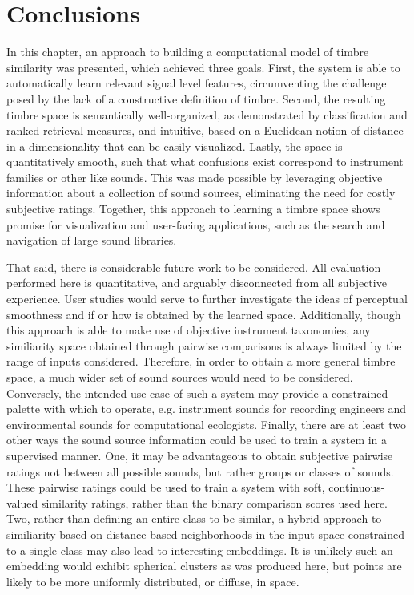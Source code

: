 \section{Conclusions}
\label{sec:conclusions}

In this chapter, an approach to building a computational model of timbre similarity was presented, which achieved three goals.
First, the system is able to automatically learn relevant signal level features, circumventing the challenge posed by the lack of a constructive definition of timbre.
Second, the resulting timbre space is semantically well-organized, as demonstrated by classification and ranked retrieval measures, and intuitive, based on a Euclidean notion of distance in a dimensionality that can be easily visualized.
Lastly, the space is quantitatively smooth, such that what confusions exist correspond to instrument families or other like sounds.
This was made possible by leveraging objective information about a collection of sound sources, eliminating the need for costly subjective ratings.
Together, this approach to learning a timbre space shows promise for visualization and user-facing applications, such as the search and navigation of large sound libraries.

That said, there is considerable future work to be considered.
All evaluation performed here is quantitative, and arguably disconnected from all subjective experience.
User studies would serve to further investigate the ideas of perceptual smoothness and if or how is obtained by the learned space.
Additionally, though this approach is able to make use of objective instrument taxonomies, any similiarity space obtained through pairwise comparisons is always limited by the range of inputs considered.
Therefore, in order to obtain a more general timbre space, a much wider set of sound sources would need to be considered.
Conversely, the intended use case of such a system may provide a constrained palette with which to operate, e.g. instrument sounds for recording engineers and environmental sounds for computational ecologists.
Finally, there are at least two other ways the sound source information could be used to train a system in a supervised manner.
One, it may be advantageous to obtain subjective pairwise ratings not between all possible sounds, but rather groups or classes of sounds.
These pairwise ratings could be used to train a system with soft, continuous-valued similarity ratings, rather than the binary comparison scores used here.
Two, rather than defining an entire class to be similar, a hybrid approach to similiarity based on distance-based neighborhoods in the input space constrained to a single class may also lead to interesting embeddings.
It is unlikely such an embedding would exhibit spherical clusters as was produced here, but points are likely to be more uniformly distributed, or diffuse, in space.


